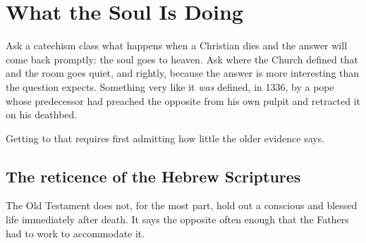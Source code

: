 \section{What the Soul Is Doing}

Ask a catechism class what happens when a Christian dies and the answer will come back promptly: the soul goes to heaven. Ask where the Church defined that and the room goes quiet, and rightly, because the answer is more interesting than the question expects. Something very like it \emph{was} defined, in 1336, by a pope whose predecessor had preached the opposite from his own pulpit and retracted it on his deathbed.

Getting to that requires first admitting how little the older evidence says.

\subsection{The reticence of the Hebrew Scriptures}

The Old Testament does not, for the most part, hold out a conscious and blessed life immediately after death. It says the opposite often enough that the Fathers had to work to accommodate it.


